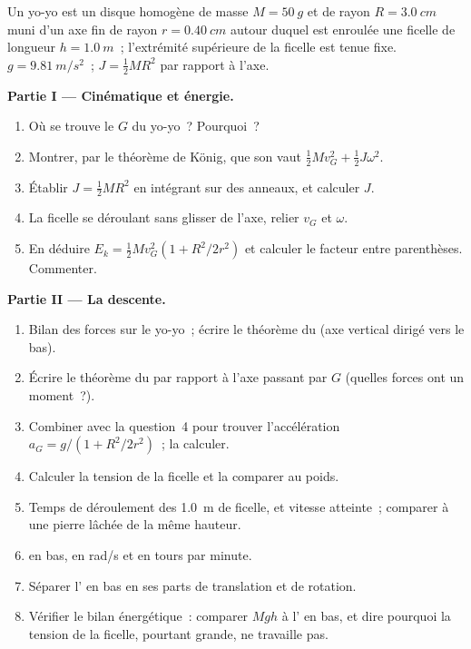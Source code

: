 \begin{problem}
\label{pb:b1:systems-of-points:1}
Un yo-yo est un disque homogène de masse $M = \qty{50}{g}$ et de rayon $R =
\qty{3.0}{cm}$ muni d'un axe fin de rayon $r = \qty{0.40}{cm}$ autour
duquel est enroulée une ficelle de longueur $h = \qty{1.0}{m}$~;
l'extrémité supérieure de la ficelle est tenue fixe.
$g = \qty{9.81}{m/s^2}$~; $J = \tfrac12 MR^2$ par rapport à l'axe.

\medskip
\noindent\textbf{Partie I --- Cinématique et énergie.}
\begin{enumerate}
  \item Où se trouve le  $G$ du yo-yo~? Pourquoi~?
  \item Montrer, par le théorème de König, que son  vaut $\tfrac12
        Mv_G^2 + \tfrac12 J\omega^2$.
  \item Établir $J = \tfrac12 MR^2$ en intégrant sur des anneaux, et
        calculer $J$.
  \item La ficelle se déroulant sans glisser de l'axe, relier $v_G$ et
        $\omega$.
  \item En déduire $E_k = \tfrac12 Mv_G^2(1 + R^2/2r^2)$ et calculer le
        facteur entre parenthèses. Commenter.
\end{enumerate}

\medskip
\noindent\textbf{Partie II --- La descente.}
\begin{enumerate}[resume]
  \item Bilan des forces sur le yo-yo~; écrire le théorème du  (axe vertical dirigé vers le bas).
  \item Écrire le théorème du  par rapport à l'axe
        passant par $G$ (quelles forces ont un moment~?).
  \item Combiner avec la question~4 pour trouver l'accélération $a_G = g/(1 +
        R^2/2r^2)$~; la calculer.
  \item Calculer la tension de la ficelle et la comparer au poids.
  \item Temps de déroulement des \qty{1.0}{m} de ficelle, et vitesse
        atteinte~; comparer à une pierre lâchée de la même hauteur.
  \item {} en bas, en rad/s et en tours par minute.
  \item Séparer l' en bas en ses parts de translation et
        de rotation.
  \item Vérifier le bilan énergétique~: comparer $Mgh$ à l' en bas, et dire pourquoi la tension de la ficelle,
        pourtant grande, ne travaille pas.
\end{enumerate}


\end{problem}
